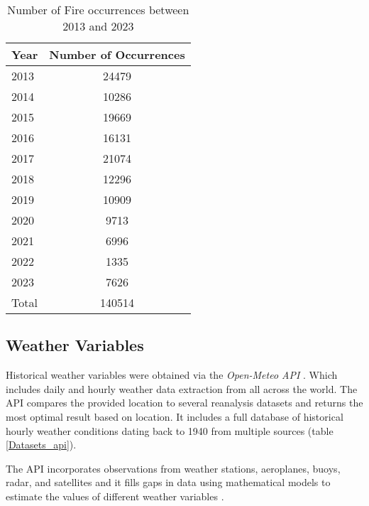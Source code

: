 \begin{table}[H]
	\centering
	\caption{Number of Fire occurrences between 2013 and 2023}
	\label{number_occurrences_2013_2023}
	\begin{tabular}{lc}
		Year  & \multicolumn{1}{l}{Number of Occurrences} \\ \hline
		2013  & 24479                                     \\
		2014  & 10286                                     \\
		2015  & 19669                                     \\
		2016  & 16131                                     \\
		2017  & 21074                                     \\
		2018  & 12296                                     \\
		2019  & 10909                                     \\
		2020  & 9713                                      \\
		2021  & 6996                                      \\
		2022  & 1335                                      \\
		2023  & 7626                                      \\ \hline
		Total & 140514                                    \\ \hline
	\end{tabular}
\end{table}



\subsection{Weather Variables}
Historical weather variables were obtained via the \textit{Open-Meteo API} \cite{Zippenfenig_Open-Meteo}. Which includes daily and hourly weather data extraction from all across the world. The API compares the provided location to several reanalysis datasets and returns the most optimal result based on location. It includes a full database of historical hourly weather conditions dating back to 1940 from multiple sources (table \ref{Datasets_api}). 

The API incorporates observations from weather stations, aeroplanes, buoys, radar, and satellites and it fills gaps in data using mathematical models to estimate the values of different weather variables \cite{Zippenfenig_Open-Meteo}.


